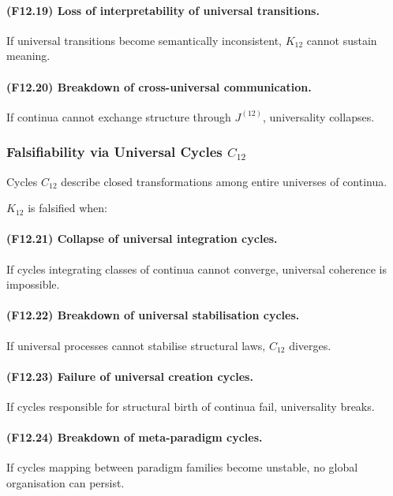 \paragraph{(F12.19) Loss of interpretability of universal transitions.}
If universal transitions become semantically inconsistent,
$K_{12}$ cannot sustain meaning.

\paragraph{(F12.20) Breakdown of cross-universal communication.}
If continua cannot exchange structure through $J^{(12)}$,
universality collapses.



\subsubsection{Falsifiability via Universal Cycles $C_{12}$}

Cycles $C_{12}$ describe closed transformations among entire universes
of continua.

$K_{12}$ is falsified when:

\paragraph{(F12.21) Collapse of universal integration cycles.}
If cycles integrating classes of continua cannot converge,
universal coherence is impossible.

\paragraph{(F12.22) Breakdown of universal stabilisation cycles.}
If universal processes cannot stabilise structural laws,
$C_{12}$ diverges.

\paragraph{(F12.23) Failure of universal creation cycles.}
If cycles responsible for structural birth of continua fail,
universality breaks.

\paragraph{(F12.24) Breakdown of meta-paradigm cycles.}
If cycles mapping between paradigm families become unstable,
no global organisation can persist.

